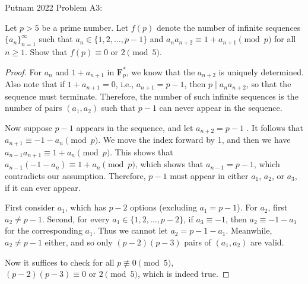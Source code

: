 \documentclass{article}
\newcommand{\F}{\mathbf{F}}
\begin{document}
\noindent \large Putnam 2022 Problem A3:

\normalsize Let $p > 5$ be a prime number. Let $f(p)$ denote the number of infinite sequences $\{a_n\}_{n=1}^\infty$ such that $a_n \in \{1,2,\dots,p-1\}$ and $a_n a_{n+2} \equiv 1+a_{n+1} \pmod{p}$ for all $n \geq 1$. Show that $f(p) \equiv 0 \text{ or } 2 \pmod{5}$.

\begin{proof}
    For $a_n$ and $1+a_{n+1}$ in $\F_p^*$, we know that the $a_{n+2}$ is uniquely determined. Also note that if $1+a_{n+1} = 0$, i.e., $a_{n+1} = p-1$, then $p \mid a_n a_{n+2}$, so that the sequence must terminate. Therefore, the number of such infinite sequences is the number of pairs $(a_1,a_2)$ such that $p-1$ can never appear in the sequence.

    Now suppose $p-1$ appears in the sequence, and let $a_{n+2} = p-1$ . It follows that $a_{n+1} \equiv -1 - a_n \pmod{p}$. We move the index forward by 1, and then we have $a_{n-1}a_{n+1} \equiv 1 + a_n \pmod{p}$. This shows that $a_{n-1} (-1-a_n) \equiv 1 + a_n \pmod{p}$, which shows that $a_{n-1} = p - 1$, which contradicts our assumption. Therefore, $p-1$ must appear in either $a_1$, $a_2$, or $a_3$, if it can ever appear.

    First consider $a_1$, which has $p-2$ options (excluding $a_1 = p-1$). For $a_2$, first $a_2 \neq p-1$. Second, for every $a_1 \in \{1,2,\dots,p-2\}$,  if $a_3 \equiv -1$, then $a_2 \equiv -1-a_1$ for the corresponding $a_1$. Thus we cannot let $a_2 = p-1-a_1$. Meanwhile, $a_2 \neq p-1$ either, and so only $(p-2)(p-3)$ pairs of $(a_1,a_2)$ are valid.

    Now it suffices to check for all $p \not\equiv 0 \pmod{5}$, $(p-2)(p-3) \equiv 0 \text{ or } 2 \pmod{5}$, which is indeed true.
\end{proof}
\end{document}
